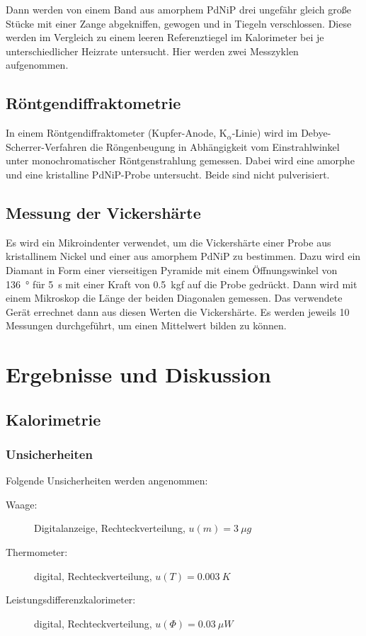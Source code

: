 \documentclass[
	a4paper,
	12pt,
	pagesize,
	ngerman
]{scrartcl}
\begin{document}
	Dann werden von einem Band aus amorphem PdNiP drei ungefähr gleich große Stücke mit einer Zange abgekniffen, gewogen und in Tiegeln verschlossen.
	Diese werden im Vergleich zu einem leeren Referenztiegel im Kalorimeter bei je unterschiedlicher Heizrate untersucht.
 	Hier werden zwei Messzyklen aufgenommen.

	\subsection{Röntgendiffraktometrie} %
	In einem Röntgendiffraktometer (Kupfer-Anode, $\text{K}_\alpha$-Linie) wird im Debye-Scherrer-Verfahren die Röngenbeugung in Abhängigkeit vom Einstrahlwinkel unter monochromatischer Röntgenstrahlung gemessen.
	Dabei wird eine amorphe und eine kristalline PdNiP-Probe untersucht.
	Beide sind nicht pulverisiert.	%

	\subsection{Messung der Vickershärte}
 	Es wird ein Mikroindenter verwendet, um die Vickershärte einer Probe aus kristallinem Nickel und einer aus amorphem PdNiP zu bestimmen. %
	Dazu wird ein Diamant in Form einer vierseitigen Pyramide mit einem Öffnungswinkel von \SI{136}{\degree} für \SI{5}{s} mit einer Kraft von \SI{0.5}{kgf} auf die Probe gedrückt.
	Dann wird mit einem Mikroskop die Länge der beiden Diagonalen gemessen.
	Das verwendete Gerät errechnet dann aus diesen Werten die Vickershärte.
	Es werden jeweils \num{10} Messungen durchgeführt, um einen Mittelwert bilden zu können.

	\section{Ergebnisse und Diskussion}

	\subsection{Kalorimetrie}
	\subsubsection{Unsicherheiten}
	Folgende Unsicherheiten werden angenommen:
	\begin{description}
		\item[Waage:]  Digitalanzeige, Rechteckverteilung, $u(m)=\SI{3}{\mu g}$
		\item[Thermometer:] digital, Rechteckverteilung, $u(T)=\SI{0.003}{K}$
		\item[Leistungsdifferenzkalorimeter:] digital, Rechteckverteilung, $u(\Phi)=\SI{0.03}{\mu W}$
	\end{description}
\end{document}
